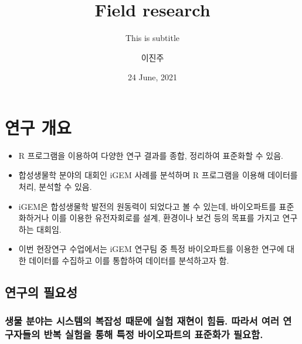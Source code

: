 \documentclass[
]{article}
\title{Field research}
\subtitle{This is subtitle}
\author{이진주}
\date{24 June, 2021}
\begin{document}
\maketitle

{
\setcounter{tocdepth}{2}
\tableofcontents
}
\hypertarget{uxc5f0uxad6c-uxac1cuxc694}{%
\section{연구 개요}\label{uxc5f0uxad6c-uxac1cuxc694}}

\begin{itemize}
\item
  R 프로그램을 이용하여 다양한 연구 결과를 종합, 정리하여 표준화할 수
  있음.
\item
  합성생물학 분야의 대회인 iGEM 사례를 분석하며 R 프로그램을 이용해
  데이터를 처리, 분석할 수 있음.
\item
  iGEM은 합성생물학 발전의 원동력이 되었다고 볼 수 있는데, 바이오파트를
  표준화하거나 이를 이용한 유전자회로를 설계, 환경이나 보건 등의 목표를
  가지고 연구하는 대회임.
\item
  이번 현장연구 수업에서는 iGEM 연구팀 중 특정 바이오파트를 이용한
  연구에 대한 데이터를 수집하고 이를 통합하여 데이터를 분석하고자 함.
\end{itemize}

\hypertarget{uxc5f0uxad6cuxc758-uxd544uxc694uxc131}{%
\subsection{연구의 필요성}\label{uxc5f0uxad6cuxc758-uxd544uxc694uxc131}}

\hypertarget{uxc0dduxbb3c-uxbd84uxc57cuxb294-uxc2dcuxc2a4uxd15cuxc758-uxbcf5uxc7a1uxc131-uxb54cuxbb38uxc5d0-uxc2e4uxd5d8-uxc7acuxd604uxc774-uxd798uxb4ec.-uxb530uxb77cuxc11c-uxc5ecuxb7ec-uxc5f0uxad6cuxc790uxb4e4uxc758-uxbc18uxbcf5-uxc2e4uxd5d8uxc744-uxd1b5uxd574-uxd2b9uxc815-uxbc14uxc774uxc624uxd30cuxd2b8uxc758-uxd45cuxc900uxd654uxac00-uxd544uxc694uxd568.}{%
\subsubsection{생물 분야는 시스템의 복잡성 때문에 실험 재현이 힘듬.
따라서 여러 연구자들의 반복 실험을 통해 특정 바이오파트의 표준화가
필요함.}\label{uxc0dduxbb3c-uxbd84uxc57cuxb294-uxc2dcuxc2a4uxd15cuxc758-uxbcf5uxc7a1uxc131-uxb54cuxbb38uxc5d0-uxc2e4uxd5d8-uxc7acuxd604uxc774-uxd798uxb4ec.-uxb530uxb77cuxc11c-uxc5ecuxb7ec-uxc5f0uxad6cuxc790uxb4e4uxc758-uxbc18uxbcf5-uxc2e4uxd5d8uxc744-uxd1b5uxd574-uxd2b9uxc815-uxbc14uxc774uxc624uxd30cuxd2b8uxc758-uxd45cuxc900uxd654uxac00-uxd544uxc694uxd568.}}
\end{document}
